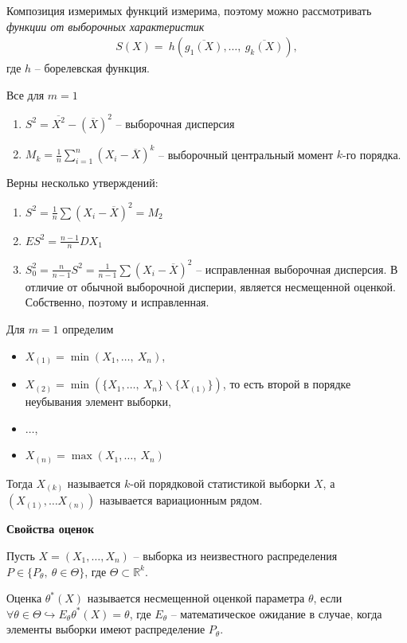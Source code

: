 Композиция измеримых функций измерима, поэтому можно рассмотривать \textit{функции от выборочных характеристик}
\begin{gather*}
    S( X) =\ h\left(\overline{g_{1}( X)} ,\dotsc,\ \overline{g_{k}( X)}\right),
\end{gather*}
где $h$ -- борелевская функция.
\begin{example}
Все для $\displaystyle m=1$
\begin{enumerate}
    \item $\displaystyle S^{2} =\overline{X^{2}} -(\overline{X})^{2}$ -- выборочная дисперсия
    
    \item $\displaystyle M_{k} =\frac{1}{n}\sum _{i=1}^n( X_{i} -\overline{X})^{k}$ -- выборочный центральный момент $\displaystyle k$-го порядка.
\end{enumerate}
\end{example}
\begin{note}
Верны несколько утверждений: 
\begin{enumerate}
    \item $\displaystyle S^{2} = \frac{1}{n}\sum(X_i - \overline{X})^2 = M_{2}$
    \item $E S^2 = \frac{n-1}{n} DX_1$
    \item $S_0^2 = \frac{n}{n-1}S^2 = \frac{1}{n-1}\sum(X_i - \overline{X})^2$ -- исправленная выборочная дисперсия. В отличие от обычной выборочной дисперии, является несмещенной оценкой. Собственно, поэтому и исправленная.
\end{enumerate}
\end{note}
\begin{definition}
Для $\displaystyle m=1$ определим
\begin{itemize}
    \item $X_{( 1)} =\min( X_{1} ,\dotsc ,\ X_{n})$,
    \item $X_{( 2)} =\min(\{X_{1},\dotsc,\ X_{n}\} \backslash \{X_{( 1)}\})$, то есть второй в порядке неубывания элемент выборки,
    \item $\dotsc$,
    \item $X_{( n)} =\max( X_{1}, \dotsc,\ X_{n})$
\end{itemize}
Тогда $\displaystyle X_{( k)}$ называется $\displaystyle k$-ой порядковой статистикой выборки $\displaystyle X$, а $\displaystyle ( X_{( 1)} ,\dotsc X_{( n)})$ называется вариационным рядом.
\end{definition}
\textbf{Свойства оценок}

Пусть $\displaystyle X=( X_{1} ,\dotsc ,X_{n})$ -- выборка из неизвестного распределения $\displaystyle P\in \{P_{\theta },\ \theta \in \Theta \}$, где $\displaystyle \Theta \subset \mathbb{R}^{k}$.
\begin{definition}
Оценка $\displaystyle \theta ^{*}( X)$ называется несмещенной оценкой параметра $\displaystyle \theta $, если $\displaystyle \forall \theta \in \Theta \hookrightarrow E_{\theta } \theta ^{*}( X) =\theta $, где $\displaystyle E_{\theta }$ -- математическое ожидание в случае, когда элементы выборки имеют распределение $\displaystyle P_{\theta }$.
\end{definition}


